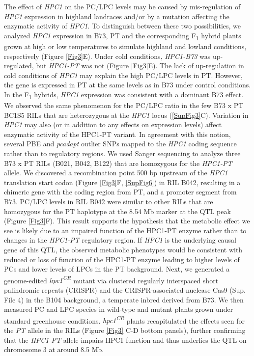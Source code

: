 \documentclass[9pt,twocolumn,twoside,lineno]{BioRxiv}
\begin{document}
The effect of \textit{HPC1} on the PC/LPC levels may be caused by mis-regulation of \textit{HPC1} expression in highland landraces and/or by a mutation affecting the enzymatic activity of \textit{HPC1}. 
To distinguish between these two possibilities, we analyzed \textit{HPC1} expression in B73, PT and the corresponding F\textsubscript{1} hybrid plants grown at high or low temperatures to simulate highland and lowland conditions, respectively (Figure \ref{Fig3}E). 
Under cold conditions, \textit{HPC1-B73} was up-regulated, but \textit{HPC1-PT} was not (Figure \ref{Fig3}E). 
The lack of up-regulation in cold conditions of \textit{HPC1} may explain the high PC/LPC levels in PT.
However, the gene is expressed in PT at the same levels as in B73 under control conditions.
In the F\textsubscript{1} hybrids, \textit{HPC1} expression was consistent with a dominant B73 effect. 
We observed the same phenomenon for the PC/LPC ratio in the few B73 x PT BC1S5 RILs that are heterozygous at the \textit{HPC1} locus (\ref{SupFig3}C).
Variation in \textit{HPC1} may also (or in addition to any effects on expression levels) affect enzymatic activity of the HPC1-PT variant. In agreement with this notion, several PBE and \textit{pcadapt} outlier SNPs mapped to the \textit{HPC1} coding sequence rather than to regulatory regions. 
We used Sanger sequencing to analyze three B73 x PT RILs (B021, B042, B122) that are homozygous for the \textit{HPC1-PT} allele.
We discovered a recombination point 500 bp upstream of the \textit{HPC1} translation start codon (Figure \ref{Fig3}F, \ref{SupFig6}) in RIL B042, resulting in a chimeric gene with the coding region from PT, and a promoter segment from B73.
PC/LPC levels in RIL B042 were similar to other RILs that are homozygous for the PT haplotype at the 8.54 Mb marker at the QTL peak (Figure \ref{Fig3}F). 
This result supports the hypothesis that the metabolic effect we see is likely due to an impaired function of the HPC1-PT enzyme rather than to changes in the \textit{HPC1-PT} regulatory region.
If \textit{HPC1} is the underlying causal gene of this QTL, the observed metabolic phenotypes would be consistent with reduced or loss of function of the HPC1-PT enzyme leading to higher levels of PCs and lower levels of LPCs in the PT background. 
Next, we generated a genome-edited \textit{hpc1\textsuperscript{CR}} mutant via clustered regularly interspaced short palindromic repeats (CRISPR) and the CRISPR-associated nuclease Cas9 (Sup. File 4) in the B104 background, a temperate inbred derived from B73. 
We then measured PC and LPC species in wild-type and mutant plants grown under standard greenhouse conditions. 
\textit{hpc1\textsuperscript{CR}} plants recapitulated the effects seen for the \textit{PT} allele in the RILs (Figure \ref{Fig3} C-D bottom panels), further confirming that the \textit{HPC1-PT} allele impairs HPC1 function and thus underlies the QTL on chromosome 3 at around 8.5 Mb. 
\end{document}
